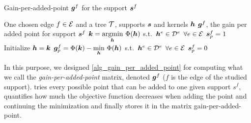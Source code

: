 \begin{algorithm}[!ht]
    \caption{Gain-per-added-point $\bm{g}^f$ for the support $\bm{s}^f$}\label{alg_gain_per_added_point}
  \begin{algorithmic}[1]
    \Input One chosen edge $f \in \mathcal E$ and a tree $\mathcal T$, supports $\bm{s}$ and kernels $\bm{h}$
    \Output $\bm{g}^f$, the gain per added point for support $\bm{s}^f$
    \State $\bm{k} = \underset{\bm{h}}{\operatorname{argmin}}~ \Phi (\bm{h})$ \quad s.t.~$\bm{h}^e \in {\mathcal D}^e$ \quad $\forall e \in \mathcal E$ 
    	\State $\bm{s}^f_p = 1$ 
    	\State Initialize $\bm{h} = \bm{k}$
    	\State $\bm{g}^f_p = \Phi(\bm{k}) - \underset{\bm{h}}{\min}~ \Phi (\bm{h})$ \quad s.t.~$\bm{h}^e \in {\mathcal D}^e$ \quad $\forall e \in \mathcal E$
    	\State $\bm{s}^f_p = 0$ 
    \EndFor
  \end{algorithmic}
\end{algorithm}

\noindent
In this purpose, we designed \cref{alg_gain_per_added_point} for computing what we call the \emph{gain-per-added-point} matrix, denoted $\bm{g}^f$ ($f$ is the edge of the studied support).  tries every possible point that can be added to one given support $s^f$, quantifies how much the objective function decreases when adding the point and continuing the minimization and finally stores it in the matrix gain-per-added-point.

